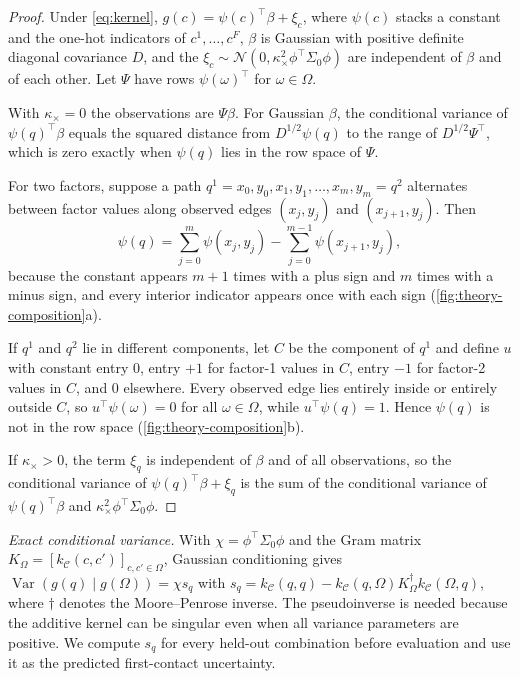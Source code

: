 \begin{proof}
Under \cref{eq:kernel}, $g(c)=\psi(c)^\top\beta+\xi_c$, where $\psi(c)$ stacks a constant and the one-hot indicators of $c^1,\dots,c^F$, $\beta$ is Gaussian with positive definite diagonal covariance $D$, and the $\xi_c\sim\mathcal N(0,\kappa_\times^2\phi^\top\Sigma_0\phi)$ are independent of $\beta$ and of each other. Let $\Psi$ have rows $\psi(\omega)^\top$ for $\omega\in\Omega$.

 With $\kappa_\times=0$ the observations are $\Psi\beta$. For Gaussian $\beta$, the conditional variance of $\psi(q)^\top\beta$ equals the squared distance from $D^{1/2}\psi(q)$ to the range of $D^{1/2}\Psi^\top$, which is zero exactly when $\psi(q)$ lies in the row space of $\Psi$.

 For two factors, suppose a path $q^1=x_0,y_0,x_1,y_1,\dots,x_m,y_m=q^2$ alternates between factor values along observed edges $(x_j,y_j)$ and $(x_{j+1},y_j)$. Then
\[
  \psi(q)=\textstyle\sum_{j=0}^{m}\psi(x_j,y_j)-\sum_{j=0}^{m-1}\psi(x_{j+1},y_j),
\]
because the constant appears $m+1$ times with a plus sign and $m$ times with a minus sign, and every interior indicator appears once with each sign (\cref{fig:theory-composition}a).

 If $q^1$ and $q^2$ lie in different components, let $C$ be the component of $q^1$ and define $u$ with constant entry $0$, entry $+1$ for factor-1 values in $C$, entry $-1$ for factor-2 values in $C$, and $0$ elsewhere. Every observed edge lies entirely inside or entirely outside $C$, so $u^\top\psi(\omega)=0$ for all $\omega\in\Omega$, while $u^\top\psi(q)=1$. Hence $\psi(q)$ is not in the row space (\cref{fig:theory-composition}b).

 If $\kappa_\times>0$, the term $\xi_q$ is independent of $\beta$ and of all observations, so the conditional variance of $\psi(q)^\top\beta+\xi_q$ is the sum of the conditional variance of $\psi(q)^\top\beta$ and $\kappa_\times^2\phi^\top\Sigma_0\phi$.
\end{proof}

\noindent\emph{Exact conditional variance.} With $\chi=\phi^\top\Sigma_0\phi$ and the Gram matrix $K_\Omega=[k_{\mathcal C}(c,c')]_{c,c'\in\Omega}$, Gaussian conditioning gives $\operatorname{Var}(g(q)\mid g(\Omega))=\chi s_q$ with $s_q=k_{\mathcal C}(q,q)-k_{\mathcal C}(q,\Omega)K_\Omega^{\dagger}k_{\mathcal C}(\Omega,q)$, where $\dagger$ denotes the Moore--Penrose inverse. The pseudoinverse is needed because the additive kernel can be singular even when all variance parameters are positive. We compute $s_q$ for every held-out combination before evaluation and use it as the predicted first-contact uncertainty.

